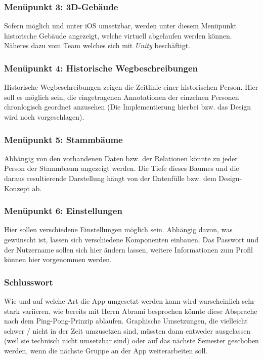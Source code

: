 \documentclass[a4paper, 11pt]{report}
\begin{document}
	\subsubsection{Menüpunkt 3:  3D-Gebäude}
	
	Sofern möglich und unter iOS umsetzbar, werden unter diesem Menüpunkt historische Gebäude angezeigt, welche virtuell abgelaufen werden können. Näheres dazu vom Team welches sich mit \textit{Unity} beschäftigt.
	
	\subsubsection{Menüpunkt 4: Historische Wegbeschreibungen}
	Historische Wegbeschreibungen zeigen die Zeitlinie einer historischen Person. Hier soll es möglich sein, die eingetragenen Annotationen der einzelnen Personen chronlogisch geordnet anzusehen (Die Implementierung hierbei bzw. das Design wird noch vorgeschlagen).
	
	\subsubsection{Menüpunkt 5: Stammbäume}
	Abhängig von den vorhandenen Daten bzw. der Relationen könnte zu jeder Person der Stammbaum angezeigt werden. Die Tiefe dieses Baumes und die daraus resultierende Darstellung hängt von der Datenfülle bzw. dem Design-Konzept ab. 
	\subsubsection{Menüpunkt 6: Einstellungen}
	
	Hier sollen verschiedene Einstellungen möglich sein. Abhängig davon, was gewünscht ist, lassen sich verschiedene Komponenten einbauen. Das Passwort und der Nutzername sollen sich hier ändern lassen, weitere Informationen zum Profil können hier vorgenommen werden.
	
	\subsubsection{Schlusswort}
	
	Wie und auf welche Art die App umgesetzt werden kann wird warscheinlich sehr stark variieren, wie bereits mit Herrn Abrami besprochen könnte diese Absprache nach dem Ping-Pong-Prinzip ablaufen. Graphische Umsetzungen, die vielleicht schwer / nicht in der Zeit umzusetzen sind, müssten dann entweder ausgelassen (weil sie technisch nicht umsetzbar sind) oder auf das nächste Semester geschoben werden, wenn die nächste Gruppe an der App weiterarbeiten soll.
	
\end{document}

